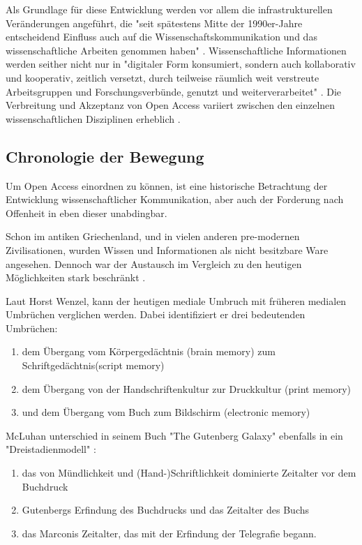 Als Grundlage für diese Entwicklung werden vor allem die infrastrukturellen Veränderungen angeführt, die "seit spätestens Mitte der 1990er-Jahre entscheidend Einfluss auch auf die Wissenschaftskommunikation und das wissenschaftliche Arbeiten genommen haben" \cite{schulze_2013_open}. Wissenschaftliche Informationen werden seither nicht nur in "digitaler Form konsumiert, sondern auch kollaborativ und kooperativ, zeitlich versetzt, durch teilweise räumlich weit verstreute Arbeitsgruppen und Forschungsverbünde, genutzt und weiterverarbeitet" \cite{schulze_2013_open}. Die Verbreitung und Akzeptanz von Open Access variiert zwischen den einzelnen wissenschaftlichen Disziplinen erheblich \cite{cite:21a} .

\subsection{Chronologie der Bewegung}
Um Open Access einordnen zu können, ist eine historische Betrachtung der Entwicklung wissenschaftlicher Kommunikation, aber auch der Forderung nach Offenheit in eben dieser unabdingbar. 

Schon im antiken Griechenland, und in vielen anderen pre-modernen Zivilisationen, wurden Wissen und Informationen als nicht besitzbare Ware angesehen\cite{cite:18}. Dennoch war der Austausch im Vergleich zu den heutigen Möglichkeiten stark beschränkt \cite{cite:17c}.

Laut Horst Wenzel, kann der heutigen mediale Umbruch mit früheren medialen Umbrüchen verglichen werden\cite{wenzel_mediengeschichte_2007}. Dabei identifiziert er drei bedeutenden Umbrüchen: 
\begin{enumerate}
\item dem Übergang vom Körpergedächtnis (brain memory) zum Schriftgedächtnis(script memory)
\item dem Übergang von der Handschriftenkultur zur Druckkultur (print memory)
\item und dem Übergang vom Buch zum Bildschirm (electronic memory)
\end{enumerate}

McLuhan unterschied in seinem Buch "The Gutenberg Galaxy" \cite{mcluhan_1962_gutenberg} ebenfalls in ein "Dreistadienmodell" \cite{wenzel_mediengeschichte_2007}:
\begin{enumerate}
\item das von Mündlichkeit und (Hand-)Schriftlichkeit dominierte Zeitalter vor dem Buchdruck
\item Gutenbergs Erfindung des Buchdrucks und das Zeitalter des Buchs
\item das Marconis Zeitalter, das mit der Erfindung der Telegrafie begann.
\end{enumerate}
    
